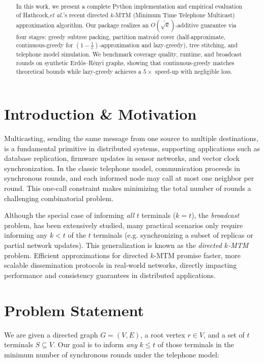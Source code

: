 \documentclass[12pt]{article}
\title{\sffamily\bfseries\thetitle}
\author{\theauthor}
\date{\thedate}
\begin{document}
\maketitle
\thispagestyle{fancy}

\begin{abstract}
In this work, we present a complete Python implementation and empirical
evaluation of Hathcock,\emph{et al.}’s recent directed \(k\)-MTM
(Minimum Time Telephone Multicast) approximation algorithm.  Our package
realizes an \(O(\widetilde{\sqrt{k}})\)-additive guarantee via four stages:
greedy subtree packing, partition matroid cover (half-approximate,
continuous-greedy for \((1-\tfrac1e)\)-approximation and lazy-greedy),
tree stitching, and telephone model simulation.  We benchmark coverage
quality, runtime, and broadcast rounds on synthetic Erdős–Rényi graphs,
showing that continuous-greedy matches theoretical bounds while
lazy-greedy achieves a \(5\times\) speed-up with negligible loss.
\end{abstract}

\section{Introduction \& Motivation}
Multicasting, sending the same message from one source to multiple destinations, is a fundamental primitive in distributed systems, supporting applications such as database replication, firmware updates in sensor networks, and vector clock synchronization.  In the classic telephone model, communication proceeds in synchronous rounds, and each informed node may call at most one neighbor per round.  This one‐call constraint makes minimizing the total number of rounds a challenging combinatorial problem.

Although the special case of informing \emph{all} \(t\) terminals (\(k=t\)), the \emph{broadcast} problem, has been extensively studied, many practical scenarios only require informing any \(k<t\) of the \(t\) terminals (e.g. synchronizing a subset of replicas or partial network updates). This generalization is known as the \emph{directed \(k\)-MTM} problem. Efficient approximations for directed \(k\)-MTM promise faster, more scalable dissemination protocols in real‐world networks, directly impacting performance and consistency guarantees in distributed applications.

\section{Problem Statement}
We are given a directed graph \(G=(V,E)\), a root vertex \(r\in V\), and a set of \(t\) terminals \(S\subseteq V\).  Our goal is to inform \emph{any} \(k\le t\) of those terminals in the minimum number of synchronous rounds under the telephone model:
\end{document}
